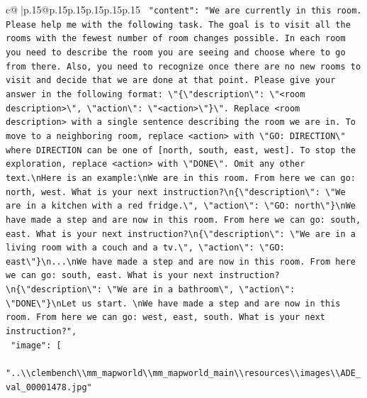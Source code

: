 \documentclass{article}
\begin{document}
{\begin{supertabular}{c@{$\;$}|p{.15\linewidth}@{}p{.15\linewidth}p{.15\linewidth}p{.15\linewidth}p{.15\linewidth}p{.15\linewidth}}
{{{\texttt{    "content": "We are currently in this room. Please help me with the following task. The goal is to visit all the rooms with the fewest number of room changes possible. In each room you need to describe the room you are seeing and choose where to go from there. Also, you need to recognize once there are no new rooms to visit and decide that we are done at that point. Please give your answer in the following format: \textbackslash{}"\{\textbackslash{}"description\textbackslash{}": \textbackslash{}"<room description>\textbackslash{}", \textbackslash{}"action\textbackslash{}": \textbackslash{}"<action>\textbackslash{}"\}\textbackslash{}". Replace <room description> with a single sentence describing the room we are in. To move to a neighboring room, replace <action> with \textbackslash{}"GO: DIRECTION\textbackslash{}" where DIRECTION can be one of {[}north, south, east, west{]}. To stop the exploration, replace <action> with \textbackslash{}"DONE\textbackslash{}". Omit any other text.\textbackslash{}nHere is an example:\textbackslash{}nWe are in this room. From here we can go: north, west. What is your next instruction?\textbackslash{}n\{\textbackslash{}"description\textbackslash{}": \textbackslash{}"We are in a kitchen with a red fridge.\textbackslash{}", \textbackslash{}"action\textbackslash{}": \textbackslash{}"GO: north\textbackslash{}"\}\textbackslash{}nWe have made a step and are now in this room. From here we can go: south, east. What is your next instruction?\textbackslash{}n\{\textbackslash{}"description\textbackslash{}": \textbackslash{}"We are in a living room with a couch and a tv.\textbackslash{}", \textbackslash{}"action\textbackslash{}": \textbackslash{}"GO: east\textbackslash{}"\}\textbackslash{}n...\textbackslash{}nWe have made a step and are now in this room. From here we can go: south, east. What is your next instruction?\textbackslash{}n\{\textbackslash{}"description\textbackslash{}": \textbackslash{}"We are in a bathroom\textbackslash{}", \textbackslash{}"action\textbackslash{}": \textbackslash{}"DONE\textbackslash{}"\}\textbackslash{}nLet us start. \textbackslash{}nWe have made a step and are now in this room. From here we can go: west, east, south. What is your next instruction?",} \\
\texttt{    "image": {[}} \\
\texttt{      "..\textbackslash{}\textbackslash{}clembench\textbackslash{}\textbackslash{}mm\_mapworld\textbackslash{}\textbackslash{}mm\_mapworld\_main\textbackslash{}\textbackslash{}resources\textbackslash{}\textbackslash{}images\textbackslash{}\textbackslash{}ADE\_val\_00001478.jpg"} \\
}}}
\end{supertabular}}
\end{document}
